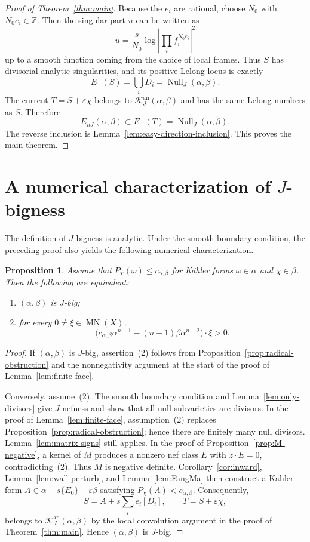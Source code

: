 \documentclass[reqno]{amsart}
\newcommand{\MN}{\operatorname{MN}}
\newcommand{\JNull}{\operatorname{Null}_{J}}
\newcommand{\JEnK}{E_{nJ}}
\newcommand{\cab}{c_{\alpha,\beta}}
\newcommand{\cK}{\mathcal K}
\theoremstyle{plain}
\newtheorem{proposition}[thm]{Proposition}
\theoremstyle{remark}
\begin{document}
\begin{proof}[Proof of Theorem~\ref{thm:main}]
Because the $e_i$ are rational, choose $N_0$ with
$N_0e_i\in\mathbb Z$. Then the singular part $u$ can be written as
\[
 u=\frac{s}{N_0}
 \log\left|\prod_i f_i^{N_0e_i}\right|^2
\]
up to a smooth function coming from the choice of local frames. Thus
$S$ has divisorial analytic
singularities, and its positive-Lelong locus is exactly
\[
 E_+(S)=\bigcup_i D_i=\JNull(\alpha,\beta).
\]
The current $T=S+\varepsilon\chi$ belongs to
$\mathcal K_J^{\mathrm{an}}(\alpha,\beta)$ and has the same Lelong
numbers as $S$.  Therefore
\[
 \JEnK(\alpha,\beta)\subset E_+(T)=\JNull(\alpha,\beta).
\]
The reverse inclusion is Lemma~\ref{lem:easy-direction-inclusion}.
This proves the main theorem.
\end{proof}

\section{A numerical characterization of \texorpdfstring{$J$}{J}-bigness}

The definition of $J$-bigness is analytic. Under the smooth boundary
condition, the preceding proof also yields the following numerical
characterization.
\begin{proposition}\label{prop:J-big-characterization}
Assume that $P_\chi(\omega)\leq\cab$ for K\"ahler forms
$\omega\in\alpha$ and $\chi\in\beta$. Then the following are
equivalent:
\begin{enumerate}[label=\textup{(\arabic*)}]
 \item $(\alpha,\beta)$ is $J$-big;
 \item for every $0\neq\xi\in\MN(X)$,
 \[
  \bigl(\cab\alpha^{n-1}-(n-1)\beta\alpha^{n-2}\bigr)\cdot\xi>0.
 \]
\end{enumerate}
\end{proposition}
\begin{proof}
If $(\alpha,\beta)$ is $J$-big, assertion~\textup{(2)} follows from
Proposition~\ref{prop:radical-obstruction} and the nonnegativity
argument at the start of the proof of Lemma~\ref{lem:finite-face}.

Conversely, assume~\textup{(2)}. The smooth boundary condition and
Lemma~\ref{lem:only-divisors} give $J$-nefness and show that all null
subvarieties are divisors. In the proof of Lemma~\ref{lem:finite-face},
assumption~\textup{(2)} replaces
Proposition~\ref{prop:radical-obstruction}; hence there are finitely
many null divisors. Lemma~\ref{lem:matrix-signs} still applies. In the
proof of Proposition~\ref{prop:M-negative}, a kernel of $M$ produces a
nonzero nef class $E$ with $z\cdot E=0$, contradicting~\textup{(2)}.
Thus $M$ is negative definite. Corollary~\ref{cor:inward},
Lemma~\ref{lem:wall-perturb}, and Lemma~\ref{lem:FangMa} then construct
a K\"ahler form $A\in\alpha-s\{E_0\}-\varepsilon\beta$ satisfying
$P_\chi(A)<\cab$. Consequently,
\[
 S=A+s\sum_i e_i[D_i],
 \qquad T=S+\varepsilon\chi,
\]
belongs to $\cK_J^{\mathrm{an}}(\alpha,\beta)$ by the local convolution
argument in the proof of Theorem~\ref{thm:main}. Hence
$(\alpha,\beta)$ is $J$-big.
\end{proof}
\end{document}
